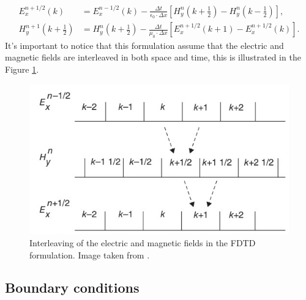 \documentclass[12pt, oneside]{book}
\begin{document}
\begin{align}
    E_{x}^{n+1 / 2}(k) &=E_{x}^{n-1 / 2}(k)-\frac{\Delta t}{\epsilon_{0} \cdot \Delta x}\left[H_{y}^{n}\left(k+\frac{1}{2}\right)-H_{y}^{n}\left(k-\frac{1}{2}\right)\right], \\
    H_{y}^{n+1}\left(k+\frac{1}{2}\right) &=H_{y}^{n}\left(k+\frac{1}{2}\right)-\frac{\Delta t}{\mu_{0} \cdot \Delta x}\left[E_{x}^{n+1 / 2}(k+1)-E_{x}^{n+1 / 2}(k)\right].
\end{align}
It's important to notice that this formulation assume that the electric and magnetic fields are interleaved in both space and time, this is illustrated in the Figure \ref{fig:sullivaninterleaved}.
\begin{figure}[h]
    \centering
    \includegraphics[scale=0.8]{Imagenes/Sullivan_interleaved.jpg}
    \caption{Interleaving of the electric and magnetic fields in the FDTD formulation. Image taken from \cite{Sullivan2020}.}
    \label{fig:sullivaninterleaved}
\end{figure}
\subsection{Boundary conditions}
\end{document}
